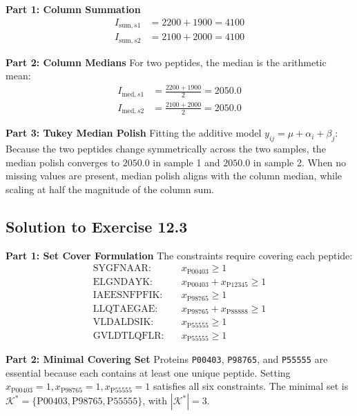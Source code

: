 \documentclass[11pt,twoside,openright]{book}
\begin{document}
\noindent\textbf{Part 1: Column Summation}\enspace
\begin{align*}
I_{\text{sum}, s1} &= 2200 + 1900 = 4100 \\
I_{\text{sum}, s2} &= 2100 + 2000 = 4100
\end{align*}

\noindent\textbf{Part 2: Column Medians}\enspace
For two peptides, the median is the arithmetic mean:
\begin{align*}
I_{\text{med}, s1} &= \frac{2200 + 1900}{2} = 2050.0 \\
I_{\text{med}, s2} &= \frac{2100 + 2000}{2} = 2050.0
\end{align*}

\noindent\textbf{Part 3: Tukey Median Polish}\enspace
Fitting the additive model $y_{ij} = \mu + \alpha_i + \beta_j$:
Because the two peptides change symmetrically across the two samples, the median polish converges to $2050.0$ in sample 1 and $2050.0$ in sample 2. When no missing values are present, median polish aligns with the column median, while scaling at half the magnitude of the column sum.

\subsection{Solution to Exercise 12.3}

\noindent\textbf{Part 1: Set Cover Formulation}\enspace
The constraints require covering each peptide:
\begin{align*}
\text{SYGFNAAR:} & \quad x_{\text{P00403}} \ge 1 \\
\text{ELGNDAYK:} & \quad x_{\text{P00403}} + x_{\text{P12345}} \ge 1 \\
\text{IAEESNFPFIK:} & \quad x_{\text{P98765}} \ge 1 \\
\text{LLQTAEGAE:} & \quad x_{\text{P98765}} + x_{\text{P88888}} \ge 1 \\
\text{VLDALDSIK:} & \quad x_{\text{P55555}} \ge 1 \\
\text{GVLDTLQFLR:} & \quad x_{\text{P55555}} \ge 1
\end{align*}

\noindent\textbf{Part 2: Minimal Covering Set}\enspace
Proteins \texttt{P00403}, \texttt{P98765}, and \texttt{P55555} are essential because each contains at least one unique peptide.
Setting $x_{\text{P00403}} = 1, x_{\text{P98765}} = 1, x_{\text{P55555}} = 1$ satisfies all six constraints.
The minimal set is $\mathcal{K}^* = \{\text{P00403}, \text{P98765}, \text{P55555}\}$, with $|\mathcal{K}^*| = 3$.
\end{document}
